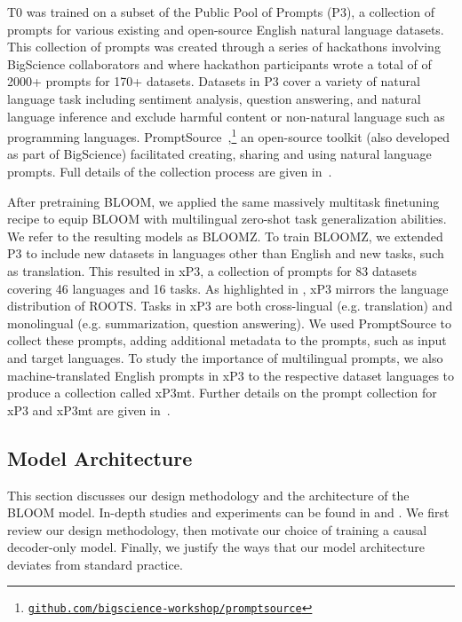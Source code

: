 \documentclass[twoside,11pt]{article}
\begin{document}
T0 was trained on a subset of the Public Pool of Prompts (P3), a collection of prompts for various existing and open-source English natural language datasets. This collection of prompts was created through a series of hackathons involving BigScience collaborators and where hackathon participants wrote a total of of 2000+ prompts for 170+ datasets.
Datasets in P3 cover a variety of natural language task including sentiment analysis, question answering, and natural language inference and exclude harmful content or non-natural language such as programming languages. PromptSource~\citep{bach2022promptsource},\footnote{\href{https://github.com/bigscience-workshop/promptsource}{\texttt{github.com/bigscience-workshop/promptsource}}} an open-source toolkit (also developed as part of BigScience) facilitated creating, sharing and using natural language prompts. Full details of the collection process are given in~\citep{sanh2022multitask,bach2022promptsource}.  

After pretraining BLOOM, we applied the same massively multitask finetuning recipe to equip BLOOM with multilingual zero-shot task generalization abilities. We refer to the resulting models as BLOOMZ. To train BLOOMZ, we extended P3 to include new datasets in languages other than English and new tasks, such as translation. This resulted in xP3, a collection of prompts for 83 datasets covering 46 languages and 16 tasks. As highlighted in , xP3 mirrors the language distribution of ROOTS. Tasks in xP3 are both cross-lingual (e.g. translation) and monolingual (e.g. summarization, question answering). We used PromptSource to collect these prompts, adding additional metadata to the prompts, such as input and target languages. To study the importance of multilingual prompts, we also machine-translated English prompts in xP3 to the respective dataset languages to produce a collection called xP3mt. Further details on the prompt collection for xP3 and xP3mt are given in~\cite{muennighoff2022crosslingual}.

\subsection{Model Architecture}
\label{sec:modeling}

This section discusses our design methodology and the architecture of the BLOOM model. 
In-depth studies and experiments can be found in \citet{scao2022what} and \citet{wang2022what}. We first review our design methodology, then motivate our choice of training a causal decoder-only model. Finally, we justify the ways that our model architecture deviates from standard practice.
\end{document}
